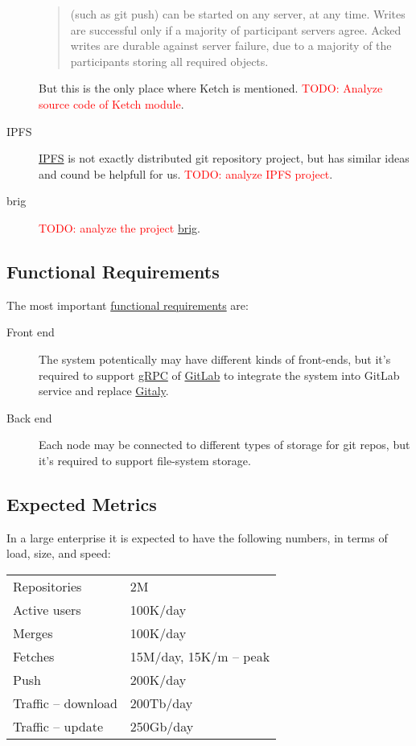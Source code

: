 \documentclass[acmlarge, screen, nonacm, 11pt]{acmart}
\newcommand{\todo}[1]{\textcolor{red}{TODO: #1}}
\begin{document}
\begin{description}
\begin{quote}
      (such as git push) can be started on any server, at any time. Writes
      are successful only if a majority of participant servers agree.
      Acked writes are durable against server failure, due to a majority of
      the participants storing all required objects.
    \end{quote}
    But this is the only place where Ketch is mentioned. \todo{Analyze source code of Ketch module}.
  \item[IPFS]
    \href{https://ipfs.io/}{IPFS} is not exactly distributed git repository project, but has similar ideas
    and cound be helpfull for us. \todo{analyze IPFS project}.
  \item[brig]
    \todo{analyze the project} \href{https://github.com/sahib/brig}{brig}.
\end{description}

\subsection{Functional Requirements}
\label{sec:nfr}

The most important \href{https://en.wikipedia.org/wiki/Functional_requirement}{functional requirements} are:

\begin{description}
  \item[Front end]
    The system potentically may have different kinds of front-ends,
    but it's required to support \href{https://grpc.io/}{gRPC}
    of \href{https://about.gitlab.com/}{GitLab} to integrate the system
    into GitLab service and replace
    \href{https://docs.gitlab.com/ee/administration/gitaly/}{Gitaly}.
  \item[Back end]
    Each node may be connected to different types of storage for git repos,
    but it's required to support file-system storage.
\end{description}

\subsection{Expected Metrics}
\label{ref:metrics}

In a large enterprise it is expected to have the following
numbers, in terms of load, size, and speed:

\begin{tabular}{ll}
  Repositories & 2M \\
  Active users & 100K/day \\
  Merges & 100K/day \\
  Fetches & 15M/day, 15K/m -- peak \\
  Push & 200K/day \\
  Traffic -- download & 200Tb/day \\
  Traffic -- update & 250Gb/day \\
\end{tabular}
\end{document}
